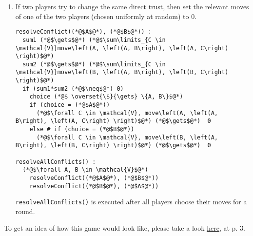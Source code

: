 \begin{enumerate}
  \newpage

  \item If two players try to change the same direct trust, then set the relevant moves of one of the two players (chosen
    uniformly at random) to 0.
  \begin{lstlisting}[label=conflict, style=numbers]
resolveConflict((*@$A$@*), (*@$B$@*)) :
  sum1 (*@$\gets$@*) (*@$\sum\limits_{C \in \mathcal{V}}move\left(A, \left(A, B\right), \left(A, C\right) \right)$@*)
  sum2 (*@$\gets$@*) (*@$\sum\limits_{C \in \mathcal{V}}move\left(B, \left(A, B\right), \left(B, C\right) \right)$@*)
  if (sum1*sum2 (*@$\neq$@*) 0)
    choice (*@$ \overset{\$}{\gets} \{A, B\}$@*)
    if (choice = (*@$A$@*))
      (*@$\forall C \in \mathcal{V}, move\left(A, \left(A, B\right), \left(A, C\right) \right)$@*) (*@$\gets$@*)  0
    else # if (choice = (*@$B$@*))
      (*@$\forall C \in \mathcal{V}, move\left(B, \left(A, B\right), \left(B, C\right) \right)$@*) (*@$\gets$@*)  0

resolveAllConflicts() :
  (*@$\forall A, B \in \mathcal{V}$@*)
    resolveConflict((*@$A$@*), (*@$B$@*))
    resolveConflict((*@$B$@*), (*@$A$@*))
  \end{lstlisting}
  \texttt{resolveAllConflicts()} is executed after all players choose their moves for a round.
\end{enumerate}

\noindent To get an idea of how this game would look like, please take a look
\href{http://www.agsm.edu.au/bobm/teaching/SGTM/lect06pr-3.pdf}{here}, at p. 3.

\hrulefill
\newpage
